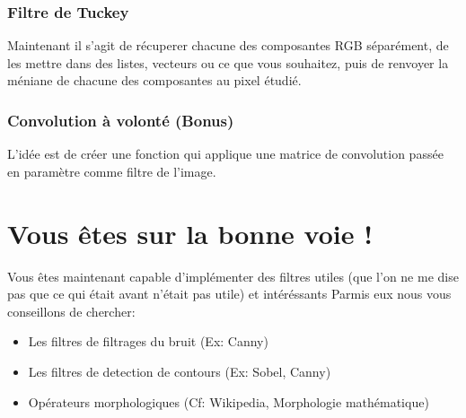 \documentclass[a4paper]{article}
\begin{document}
\subsubsection{Filtre de Tuckey}
Maintenant il s'agit de récuperer chacune des composantes RGB séparément, de les mettre dans des listes, 
vecteurs ou ce que vous souhaitez, puis de renvoyer la méniane de chacune des composantes au pixel étudié.
\subsubsection{Convolution à volonté (Bonus)}
L'idée est de créer une fonction qui applique une matrice de convolution passée en paramètre comme filtre de l'image.


\section{Vous êtes sur la bonne voie !}
Vous êtes maintenant capable d'implémenter des filtres utiles (que l'on ne me dise pas que ce qui était avant n'était pas utile) et intéréssants
Parmis eux nous vous conseillons de chercher:
\begin{itemize}
\item Les filtres de filtrages du bruit (Ex: Canny)
\item Les filtres de detection de contours (Ex: Sobel, Canny)
\item Opérateurs morphologiques (Cf: Wikipedia, Morphologie mathématique)
\end{itemize}
\end{document}
